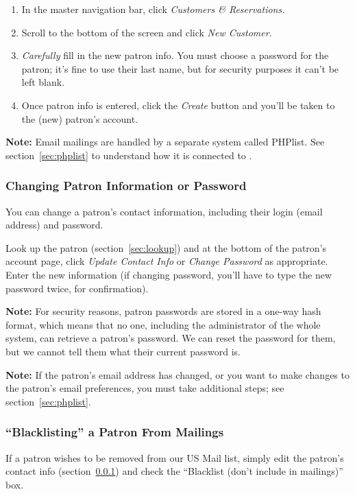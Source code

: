 \begin{enumerate}
\item In the master navigation bar, click \emph{Customers \&
    Reservations.} 
\item Scroll to the bottom of the screen and click  \emph{New
    Customer}.
\item \emph{Carefully} fill in the new patron info.  You must choose a
  password for the patron; it's fine to use their last name, but for
  security purposes it can't be left blank.
\item Once patron info is entered, click the \emph{Create} button and
  you'll be taken to the (new) patron's account.
\end{enumerate}

\textbf{Note:} Email mailings are handled by a separate system called
PHPlist.  See section~\ref{sec:phplist} to understand how it is
connected to \af.

\subsubsection{Changing Patron Information or Password}
\label{sec:changeinfo}
\label{sec:changepassword}

You can  change a patron's contact information, including their login
(email address) and password.

Look up the patron (section~\ref{sec:lookup}) and at the bottom of the
patron's account page,  click \emph{Update Contact Info} or \emph{Change
  Password} as appropriate.  Enter the new information (if changing
password, you'll have to type the new password twice, for confirmation).

\textbf{Note:} For security reasons, patron passwords are stored in a
one-way hash format, which means that no one, including the
administrator of the whole system, can retrieve a patron's password.  We
can reset the password for them, but we cannot tell them what their
current password is.

\textbf{Note:} If the patron's email address has changed, or you want to
make changes to the patron's email preferences, you must take additional
steps; see section~\ref{sec:phplist}.


\subsubsection{``Blacklisting'' a Patron From Mailings}
\label{sec:blacklisting}

If a patron wishes to be removed from our US Mail list, simply edit the
patron's contact info (section~\ref{sec:changeinfo}) and check the
``Blacklist (don't include in mailings)'' box.

